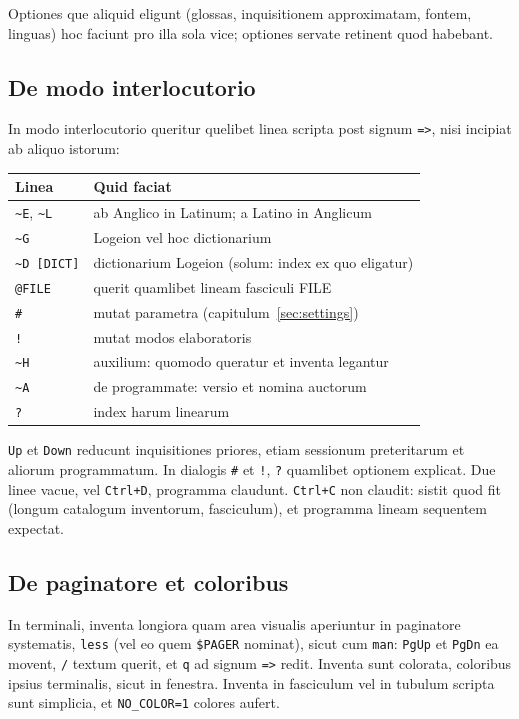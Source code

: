 \documentclass[12pt,
              article,
              oneside
              ]{memoir}
\newcommand*{\key}[1]{\texttt{#1}}
\newcommand*{\tl}{\textasciitilde}
\begin{document}
\noindent
Optiones que aliquid eligunt (glossas, inquisitionem approximatam, fontem,
linguas) hoc faciunt pro illa sola vice; optiones servate retinent quod
habebant.

\subsection{De modo interlocutorio}

%
In modo interlocutorio queritur quelibet linea scripta post signum
\texttt{=>}, nisi incipiat ab aliquo istorum:

\begin{longtable}{@{}>{\raggedright}p{}p{}@{}}
\toprule
Linea & Quid faciat\\
\midrule
\endhead
\texttt{\tl E}, \texttt{\tl L} & ab Anglico in Latinum; a Latino in Anglicum\\
\texttt{\tl G} & Logeion vel hoc dictionarium\\
\texttt{\tl D [DICT]} & dictionarium Logeion (solum: index ex quo eligatur)\\
\texttt{@FILE} & querit quamlibet lineam fasciculi FILE\\
\texttt{\#} & mutat parametra (capitulum~\ref{sec:settings})\\
\texttt{!} & mutat modos elaboratoris\\
\texttt{\tl H} & auxilium: quomodo queratur et inventa legantur\\
\texttt{\tl A} & de programmate: versio et nomina auctorum\\
\texttt{?} & index harum linearum\\
\bottomrule
\end{longtable}

\noindent{}%
\key{Up} et \key{Down} reducunt inquisitiones priores, etiam sessionum
preteritarum et aliorum programmatum. In dialogis \texttt{\#} et
\texttt{!}, \texttt{?} quamlibet optionem explicat. Due linee vacue, vel
\key{Ctrl+D}, programma claudunt. \key{Ctrl+C} non claudit: sistit quod
fit (longum catalogum inventorum, fasciculum), et programma lineam
sequentem expectat.

\subsection{De paginatore et coloribus}

%
In terminali, inventa longiora quam area visualis aperiuntur in
paginatore systematis, \texttt{less} (vel eo quem \texttt{\$PAGER}
nominat), sicut cum \texttt{man}: \key{PgUp} et \key{PgDn} ea movent,
\texttt{/} textum querit, et \texttt{q} ad signum \texttt{=>} redit.
Inventa sunt colorata, coloribus ipsius terminalis, sicut in fenestra.
Inventa in fasciculum vel in tubulum scripta sunt simplicia, et
\texttt{NO\_COLOR=1} colores aufert.
\end{document}
